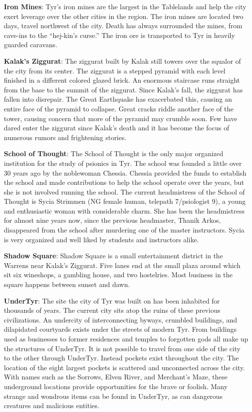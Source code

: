 {	\textbf{Iron Mines}: Tyr's iron mines are the largest in the Tablelands and help the city exert leverage over the other cities in the region. The iron mines are located two days, travel northwest of the city. Death has always surrounded the mines, from cave-ins to the ``hej-kin's curse.'' The iron ore is transported to Tyr in heavily guarded caravans.

	\textbf{Kalak's Ziggurat}: The ziggurat built by Kalak still towers over the squalor of the city from its center. The ziggurat is a stepped pyramid with each level finished in a different colored glazed brick. An enormous staircase runs straight from the base to the summit of the ziggurat. Since Kalak's fall, the ziggurat has fallen into disrepair. The Great Earthquake has exacerbated this, causing an entire face of the pyramid to collapse. Great cracks riddle another face of the tower, causing concern that more of the pyramid may crumble soon. Few have dared enter the ziggurat since Kalak's death and it has become the focus of numerous rumors and frightening stories.

	\textbf{School of Thought}: The School of Thought is the only major organized institution for the study of psionics in Tyr. The school was founded a little over 30 years ago by the noblewoman Chessia. Chessia provided the funds to establish the school and made contributions to help the school operate over the years, but she is not involved running the school. The current headmistress of the School of Thought is Sycia Strimmen (NG female human, telepath 7/psiologist 9), a young and enthusiastic woman with considerable charm. She has been the headmistress for almost nine years now, since the previous headmaster, Thanik Arkos, disappeared from the school after murdering one of the master instructors. Sycia is very organized and well liked by students and instructors alike.

	\textbf{Shadow Square}: Shadow Square is a small entertainment district in the Warrens near Kalak's Ziggurat. Five lanes end at the small plaza around which sit six wineshops, a gambling house, and two hostelries. Most business in the square happens between sunset and dawn.

	\textbf{UnderTyr}: The site the city of Tyr was built on has been inhabited for thousands of years. The current city sits atop the ruins of these previous civilizations. An undercity of interconnecting byways, crumbled buildings, and dilapidated courtyards exists under the streets of modern Tyr. From buildings used as businesses to former residences and temples to forgotten gods all make up the structures of UnderTyr. It is not possible to travel from one side of the city to the other through UnderTyr. Instead pockets exist throughout the city. The location of the eight largest pockets is scattered and unconnected across the city. With names such as the Sorrows, Elven River, and Merchant's Maze, these underground locations provide opportunities for the brave or foolish. Many strange and wondrous items can be found in UnderTyr, as can dangerous creatures and malicious entities.

}
